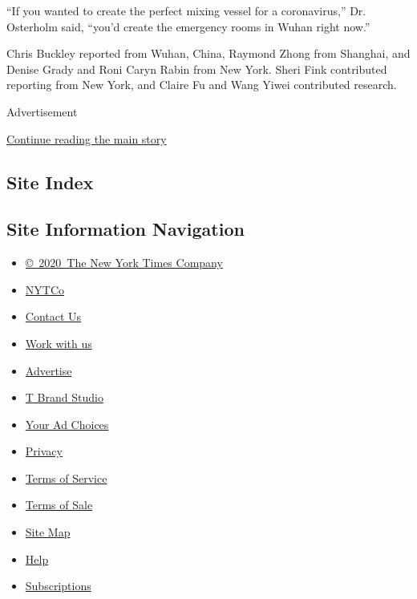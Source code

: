 ``If you wanted to create the perfect mixing vessel for a coronavirus,''
Dr. Osterholm said, ``you'd create the emergency rooms in Wuhan right
now.''

Chris Buckley reported from Wuhan, China, Raymond Zhong from Shanghai,
and Denise Grady and Roni Caryn Rabin from New York. Sheri Fink
contributed reporting from New York, and Claire Fu and Wang Yiwei
contributed research.

Advertisement

\protect\hyperlink{after-bottom}{Continue reading the main story}

\hypertarget{site-index}{%
\subsection{Site Index}\label{site-index}}

\hypertarget{site-information-navigation}{%
\subsection{Site Information
Navigation}\label{site-information-navigation}}

\begin{itemize}
\tightlist
\item
  \href{https://help.nytimes.com/hc/en-us/articles/115014792127-Copyright-notice}{©~2020~The
  New York Times Company}
\end{itemize}

\begin{itemize}
\tightlist
\item
  \href{https://www.nytco.com/}{NYTCo}
\item
  \href{https://help.nytimes.com/hc/en-us/articles/115015385887-Contact-Us}{Contact
  Us}
\item
  \href{https://www.nytco.com/careers/}{Work with us}
\item
  \href{https://nytmediakit.com/}{Advertise}
\item
  \href{http://www.tbrandstudio.com/}{T Brand Studio}
\item
  \href{https://www.nytimes.com/privacy/cookie-policy\#how-do-i-manage-trackers}{Your
  Ad Choices}
\item
  \href{https://www.nytimes.com/privacy}{Privacy}
\item
  \href{https://help.nytimes.com/hc/en-us/articles/115014893428-Terms-of-service}{Terms
  of Service}
\item
  \href{https://help.nytimes.com/hc/en-us/articles/115014893968-Terms-of-sale}{Terms
  of Sale}
\item
  \href{https://spiderbites.nytimes.com}{Site Map}
\item
  \href{https://help.nytimes.com/hc/en-us}{Help}
\item
  \href{https://www.nytimes.com/subscription?campaignId=37WXW}{Subscriptions}
\end{itemize}
